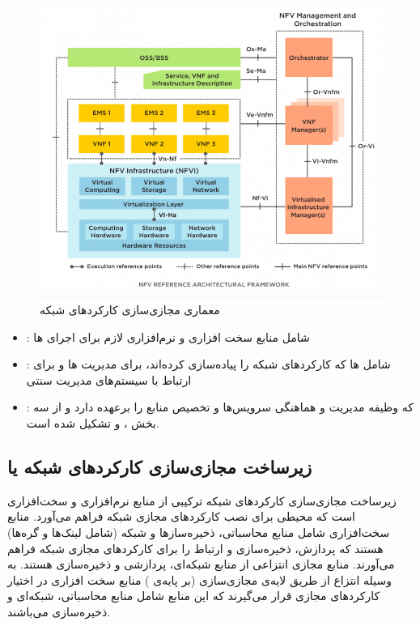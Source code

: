 \begin{figure}[!h]
\center\includegraphics[scale=.5]{images/nfv-arch}
\caption{معماری مجازی‌سازی کارکردهای شبکه
}\label{fig.1}
\end{figure}

\begin{itemize}
    \item
    : شامل منابع سخت افزاری و نرم‌افزاری لازم برای اجرای ‌ها
    \item
    : شامل ‌ها که کارکردهای شبکه را پیاده‌سازی کرده‌اند،  برای مدیریت ‌ها و  برای ارتباط با سیستم‌های مدیریت سنتی
    \item
    : که وظیفه مدیریت و هماهنگی سرویس‌ها و تخصیص منابع را برعهده دارد و از سه بخش ،  و  تشکیل شده است.
\end{itemize}

\subsection{زیرساخت مجازی‌سازی کارکردهای شبکه یا }
زیرساخت مجازی‌سازی کارکردهای شبکه ترکیبی از منابع نرم‌افزاری و سخت‌افزاری است
که محیطی برای نصب
کارکردهای مجازی شبکه فراهم می‌آورد.
منابع سخت‌افزاری شامل منابع محاسباتی،
ذخیره‌سازها و شبکه
(شامل لینک‌ها و گره‌ها)
هستند
که پردازش، ذخیره‌سازی و ارتباط را
برای کارکردهای مجازی شبکه فراهم می‌آورند.
منابع مجازی انتزاعی از منابع شبکه‌ای، پردازشی و ذخیر‌ه‌سازی هستند.
به وسیله انتزاع از طریق لایه‌ی مجازی‌سازی (بر پایه‌ی )
منابع سخت افزاری در اختیار کارکردهای مجازی
قرار می‌گیرند که این منابع شامل منابع محاسباتی، شبکه‌ای و ذخیره‌سازی می‌باشند.

